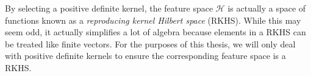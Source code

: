 By selecting a positive definite kernel, the feature space $\mathcal{H}$ is actually a space of functions known as a \textit{reproducing kernel Hilbert space} (RKHS). While this may seem odd, it actually simplifies a lot of algebra because elements in a RKHS can be treated like finite vectors.  For the purposes of this  thesis, we will only deal with positive definite kernels to ensure the corresponding feature space is a RKHS.




